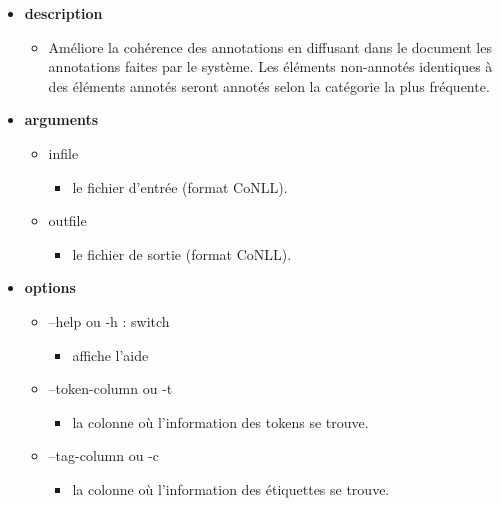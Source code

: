 \documentclass[manual-fr.tex]{subfiles}
\begin{document}
\begin{itemize}
    \item[] \textbf{description}
        \begin{itemize}
            \item[] Améliore la cohérence des annotations en diffusant dans le document les annotations faites par le système. Les éléments non-annotés identiques à des éléments annotés seront annotés selon la catégorie la plus fréquente.
        \end{itemize}
    \item[] \textbf{arguments}
        \begin{itemize}
            \item[] infile
                \begin{itemize}
                    \item[] le fichier d'entrée (format CoNLL).
                \end{itemize}
        \end{itemize}
        \begin{itemize}
            \item[] outfile
                \begin{itemize}
                    \item[] le fichier de sortie (format CoNLL).
                \end{itemize}
        \end{itemize}
    \item[] \textbf{options}
        \begin{itemize}
            \item[] --help ou -h : switch
                \begin{itemize}
                    \item[] affiche l'aide
                \end{itemize}
            \item[] --token-column ou -t
                \begin{itemize}
                    \item[] la colonne où l'information des tokens se trouve.
                \end{itemize}
            \item[] --tag-column ou -c
                \begin{itemize}
                    \item[] la colonne où l'information des étiquettes se trouve.
                \end{itemize}

\end{itemize}
\end{itemize}
\end{document}

